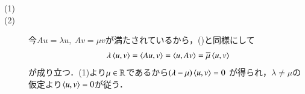 	\begin{prf}\mbox{}
		\begin{description}
			\item[(1)]
				
			\item[(2)]
				今$Au = \lambda u,\ Av = \mu v$が満たされているから，()と同様にして
				\begin{align}
					\lambda \inprod<u,v> = \inprod<Au,v> = \inprod<u,Av> = \conj{\mu} \inprod<u,v>
				\end{align}
				が成り立つ．(1)より$\mu \in \mathbb{R}$であるから$(\lambda - \mu) \inprod<u,v> = 0$
				が得られ，$\lambda \neq \mu$の仮定より$\inprod<u,v> = 0$が従う．
				\QED
		\end{description}
	\end{prf}
	
	